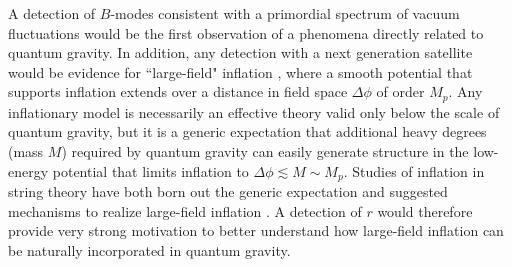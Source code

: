 
A detection of $B$-modes consistent with a primordial spectrum of vacuum fluctuations would be the first observation of a phenomena directly related to quantum gravity. In addition, any detection with a next generation satellite would be evidence for ``large-field" inflation  \cite{Lyth:1996im}, where a smooth potential that supports inflation extends over a distance in field space $\Delta\phi$ of order $M_p$. 
Any inflationary model is necessarily an effective theory valid only below the scale of quantum gravity, but it is a generic expectation that additional heavy degrees (mass $M$) required by quantum gravity \cite{} can easily generate structure in the low-energy potential that limits inflation to $\Delta\phi\lesssim M\sim M_p$. Studies of inflation in string theory have both born out the generic expectation \cite{} and suggested mechanisms to realize large-field inflation \cite{}. A detection of $r$ would therefore provide very strong motivation to better understand how large-field inflation can be naturally incorporated in quantum gravity. 

